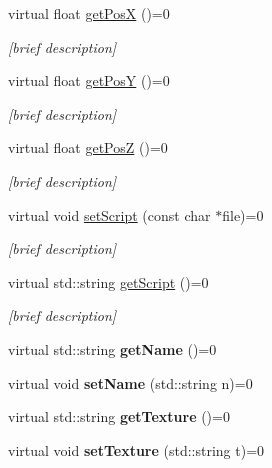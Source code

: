 \begin{DoxyCompactItemize}
virtual float \hyperlink{class_game_object_ab41e4a13b4e37f7a40a9e5cf54db07d9}{get\-Pos\-X} ()=0
\begin{DoxyCompactList}\small\item\em \mbox{[}brief description\mbox{]} \end{DoxyCompactList}\item 
virtual float \hyperlink{class_game_object_aab59caeb6b903c23a76be1ddb1497a60}{get\-Pos\-Y} ()=0
\begin{DoxyCompactList}\small\item\em \mbox{[}brief description\mbox{]} \end{DoxyCompactList}\item 
virtual float \hyperlink{class_game_object_a0eb3185aa4070664b4b7a6f23ae64f32}{get\-Pos\-Z} ()=0
\begin{DoxyCompactList}\small\item\em \mbox{[}brief description\mbox{]} \end{DoxyCompactList}\item 
virtual void \hyperlink{class_game_object_a3cdd9cb174d5fa4d4a5748df1ab09e87}{set\-Script} (const char $\ast$file)=0
\begin{DoxyCompactList}\small\item\em \mbox{[}brief description\mbox{]} \end{DoxyCompactList}\item 
virtual std\-::string \hyperlink{class_game_object_af8c16297dbff83e1ae7c4f75f314b856}{get\-Script} ()=0
\begin{DoxyCompactList}\small\item\em \mbox{[}brief description\mbox{]} \end{DoxyCompactList}\item 
\hypertarget{class_game_object_a1157a25f56fbb0d748e0b21d0f4e0316}{virtual std\-::string {\bfseries get\-Name} ()=0}\label{class_game_object_a1157a25f56fbb0d748e0b21d0f4e0316}

\item 
\hypertarget{class_game_object_abc8fe45887eb41973b3c7880a599475f}{virtual void {\bfseries set\-Name} (std\-::string n)=0}\label{class_game_object_abc8fe45887eb41973b3c7880a599475f}

\item 
\hypertarget{class_game_object_a4f276ac2bb0e6820ebc22d2d79ed0d47}{virtual std\-::string {\bfseries get\-Texture} ()=0}\label{class_game_object_a4f276ac2bb0e6820ebc22d2d79ed0d47}

\item 
\hypertarget{class_game_object_a448191b3ecefd69425f3966792ac2bb9}{virtual void {\bfseries set\-Texture} (std\-::string t)=0}\label{class_game_object_a448191b3ecefd69425f3966792ac2bb9}


\end{DoxyCompactItemize}
